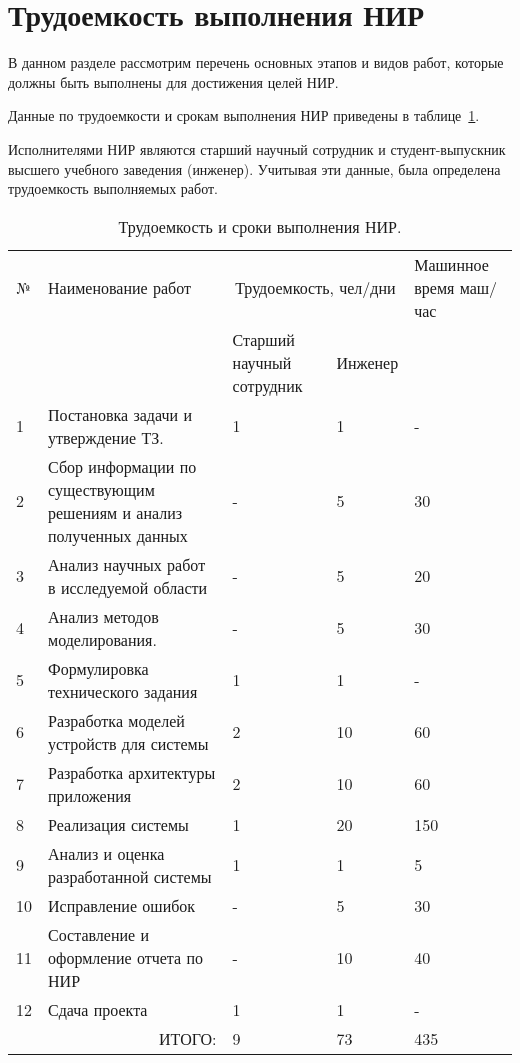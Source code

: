 \section{Трудоемкость выполнения НИР}
В данном разделе рассмотрим перечень основных этапов и видов работ, которые должны быть выполнены для достижения целей НИР.

Данные по трудоемкости и срокам выполнения НИР приведены в таблице~\ref{table1}.

Исполнителями НИР являются старший научный сотрудник и студент-выпускник высшего учебного заведения (инженер). Учитывая эти данные, была определена трудоемкость выполняемых работ.

\begin{table}
\caption{Трудоемкость и сроки выполнения НИР.}\label{table1}
\begin{tabular}{|p{1em}|p{15em}|p{7em}|p{6em}|p{8em}|}
  \hline
  № & Наименование работ & \multicolumn{2}{|c|}{Трудоемкость, чел/дни} & Машинное время маш/час \\
  \ & \ & Старший научный сотрудник & Инженер & \ \\ \hline
  1 & Постановка задачи и утверждение ТЗ. & 1 & 1 & - \\ \hline
  2 & Сбор информации по существующим решениям и анализ полученных данных & - & 5 & 30 \\ \hline
  3 & Анализ научных работ в исследуемой области & - & 5 & 20 \\ \hline
  4 & Анализ методов моделирования. & - & 5 & 30  \\ \hline
  5 & Формулировка технического задания  & 1 & 1 & - \\ \hline
  6 & Разработка моделей устройств для системы  & 2 & 10 & 60 \\ \hline
  7 & Разработка архитектуры приложения & 2 & 10 & 60  \\ \hline
  8 & Реализация системы & 1 & 20 & 150  \\ \hline
  9 & Анализ и оценка разработанной системы & 1 & 1 & 5 \\ \hline
  10 & Исправление ошибок & - & 5 & 30  \\ \hline
  11 & Составление и оформление отчета по НИР & - & 10 & 40 \\ \hline
  12 & Сдача проекта & 1 & 1 & - \\ \hline
  \multicolumn{2}{|r|}{ИТОГО:} & 9 & 73 & 435 \\ \hline
\end{tabular}
\end{table}

